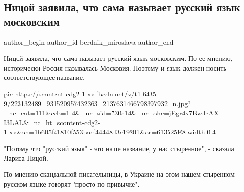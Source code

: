  
 
 
 
 
 
\subsection{Ницой заявила, что сама называет русский язык московским}
\label{sec:06_08_2021.fb.berdnik_miroslava.1.nicoj_jazyk_moskovia}
 
\ifcmt
 author_begin
   author_id berdnik_miroslava
 author_end
\fi

Ницой заявила, что сама называет русский язык московским. По ее мнению,
исторически Россия называлась Московия. Поэтому и язык должен носить
соответствующее название. 

\ifcmt
  pic https://scontent-cdg2-1.xx.fbcdn.net/v/t1.6435-9/223132489_931520957432363_2137631466798397932_n.jpg?_nc_cat=111&ccb=1-4&_nc_sid=730e14&_nc_ohc=jEgr4x7BwJcAX-I3LAL&_nc_ht=scontent-cdg2-1.xx&oh=1b605f41810f553baef44448d3c19201&oe=613525E8
  width 0.4
\fi

"Потому что "русский язык" - это наше название, у нас стыренное", - сказала
Лариса Ницой.

По мнению скандальной писательницы, в Украине на этом нашем стыренном русском
языке говорят "просто по привычке".
